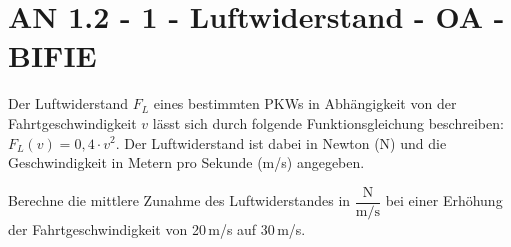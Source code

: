 \section{AN 1.2 - 1 - Luftwiderstand - OA - BIFIE}

\begin{beispiel}[AN 1.2]{1} %
Der Luftwiderstand $F_L$ eines bestimmten PKWs in Abhängigkeit von der Fahrtgeschwindigkeit $v$ lässt sich durch folgende Funktionsgleichung beschreiben: $F_L(v) = 0,4 \cdot v^2$. Der Luftwiderstand ist dabei in Newton (N) und die Geschwindigkeit in Metern pro Sekunde (m/s)
angegeben.

Berechne die mittlere Zunahme des Luftwiderstandes in $\dfrac{\text{N}}{\text{m/s}}$ bei einer Erhöhung der
Fahrtgeschwindigkeit von 20\,m/s auf 30\,m/s.

\end{beispiel}